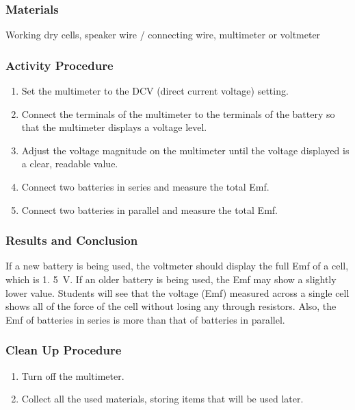 \subsubsection*{Materials}
Working dry cells, speaker wire / connecting wire, multimeter or voltmeter



\subsubsection*{Activity Procedure}
\begin{enumerate}
\item{Set the multimeter to the DCV (direct current voltage) setting.} 
\item{Connect the terminals of the multimeter to the terminals of the battery so that the multimeter displays a voltage level.} 
\item{Adjust the voltage magnitude on the multimeter until the voltage displayed is a clear, readable value.} 
\item{Connect two batteries in series and measure the total Emf.}
\item{Connect two batteries in parallel and measure the total Emf.}
\end{enumerate}

\subsubsection*{Results and Conclusion}
If a new battery is being used, the voltmeter should display the full Emf of a cell, which is 1. 5~V. If an older battery is being used, the Emf may show a slightly lower value. Students will see that the voltage (Emf) measured across a single cell shows all of the force of the cell without losing any through resistors. Also, the Emf of batteries in series is more than that of batteries in parallel.

\subsubsection*{Clean Up Procedure}
\begin{enumerate}
\item{Turn off the multimeter.} 
\item{Collect all the used materials, storing items that will be used later.} 
\end{enumerate}

